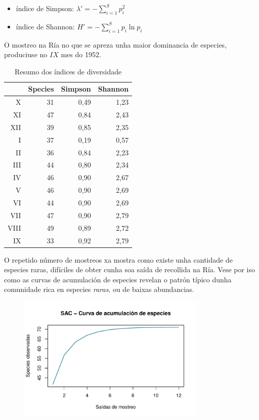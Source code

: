 \documentclass{article}
\begin{document}
\begin{itemize}
  \item índice de Simpson: $ \lambda' = -\sum_{i=1}^S p_i^2 $
  \item índice de Shannon: $ H' = -\sum_{i=1}^S p_i \ln p_i $
\end{itemize}

O mostreo na Ría no que se apreza unha maior dominancia de especies, produciuse no $IX$ mes do 1952.
 
\begin{table}[ht]
\centering
\begin{tabular}{rrrr}
  \hline
 & Species & Simpson & Shannon \\ 
  \hline
X &  31 & 0,49 & 1,23 \\ 
  XI &  47 & 0,84 & 2,43 \\ 
  XII &  39 & 0,85 & 2,35 \\ 
  I &  37 & 0,19 & 0,57 \\ 
  II &  36 & 0,84 & 2,23 \\ 
  III &  44 & 0,80 & 2,34 \\ 
  IV &  46 & 0,90 & 2,67 \\ 
  V &  46 & 0,90 & 2,69 \\ 
  VI &  44 & 0,90 & 2,69 \\ 
  VII &  47 & 0,90 & 2,79 \\ 
  VIII &  49 & 0,89 & 2,72 \\ 
  IX &  33 & 0,92 & 2,79 \\ 
   \hline
\end{tabular}
\caption{Resumo dos índices de diversidade} 
\end{table}

O repetido número de mostreos xa mostra como existe unha cantidade de especies raras, difíciles de obter cunha soa saída de recollida na Ría. Vese por iso como as curvas de acumulación de especies revelan o patrón típico dunha comunidade rica en especies \textit{raras}, ou de baixas abundancias.

\begin{figure}[htp]
    \centering
    \includegraphics[width=0.8\textwidth]{margalef53-sac}
    \label{fig:sac}
\end{figure}
\end{document}
